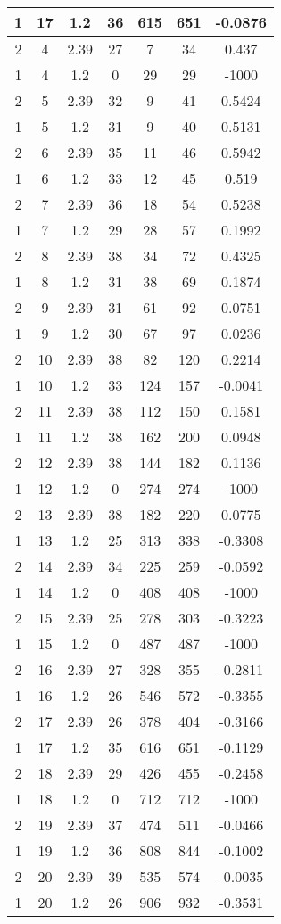 \documentclass[letterpaper, 12pt]{article}
\begin{document}
\begin{longtable}{|c|c|c|c|c|c|c|}
\hline
1 & 17 & 1.2 & 36 & 615 & 651 & -0.0876 \\
\hline
2 & 4 & 2.39 & 27 & 7 & 34 & 0.437 \\
\hline
1 & 4 & 1.2 & 0 & 29 & 29 & -1000 \\
\hline
2 & 5 & 2.39 & 32 & 9 & 41 & 0.5424 \\
\hline
1 & 5 & 1.2 & 31 & 9 & 40 & 0.5131 \\
\hline
2 & 6 & 2.39 & 35 & 11 & 46 & 0.5942 \\
\hline
1 & 6 & 1.2 & 33 & 12 & 45 & 0.519 \\
\hline
2 & 7 & 2.39 & 36 & 18 & 54 & 0.5238 \\
\hline
1 & 7 & 1.2 & 29 & 28 & 57 & 0.1992 \\
\hline
2 & 8 & 2.39 & 38 & 34 & 72 & 0.4325 \\
\hline
1 & 8 & 1.2 & 31 & 38 & 69 & 0.1874 \\
\hline
2 & 9 & 2.39 & 31 & 61 & 92 & 0.0751 \\
\hline
1 & 9 & 1.2 & 30 & 67 & 97 & 0.0236 \\
\hline
2 & 10 & 2.39 & 38 & 82 & 120 & 0.2214 \\
\hline
1 & 10 & 1.2 & 33 & 124 & 157 & -0.0041 \\
\hline
2 & 11 & 2.39 & 38 & 112 & 150 & 0.1581 \\
\hline
1 & 11 & 1.2 & 38 & 162 & 200 & 0.0948 \\
\hline
2 & 12 & 2.39 & 38 & 144 & 182 & 0.1136 \\
\hline
1 & 12 & 1.2 & 0 & 274 & 274 & -1000 \\
\hline
2 & 13 & 2.39 & 38 & 182 & 220 & 0.0775 \\
\hline
1 & 13 & 1.2 & 25 & 313 & 338 & -0.3308 \\
\hline
2 & 14 & 2.39 & 34 & 225 & 259 & -0.0592 \\
\hline
1 & 14 & 1.2 & 0 & 408 & 408 & -1000 \\
\hline
2 & 15 & 2.39 & 25 & 278 & 303 & -0.3223 \\
\hline
1 & 15 & 1.2 & 0 & 487 & 487 & -1000 \\
\hline
2 & 16 & 2.39 & 27 & 328 & 355 & -0.2811 \\
\hline
1 & 16 & 1.2 & 26 & 546 & 572 & -0.3355 \\
\hline
2 & 17 & 2.39 & 26 & 378 & 404 & -0.3166 \\
\hline
1 & 17 & 1.2 & 35 & 616 & 651 & -0.1129 \\
\hline
2 & 18 & 2.39 & 29 & 426 & 455 & -0.2458 \\
\hline
1 & 18 & 1.2 & 0 & 712 & 712 & -1000 \\
\hline
2 & 19 & 2.39 & 37 & 474 & 511 & -0.0466 \\
\hline
1 & 19 & 1.2 & 36 & 808 & 844 & -0.1002 \\
\hline
2 & 20 & 2.39 & 39 & 535 & 574 & -0.0035 \\
\hline
1 & 20 & 1.2 & 26 & 906 & 932 & -0.3531 \\
\hline
\end{longtable}
\end{document}

